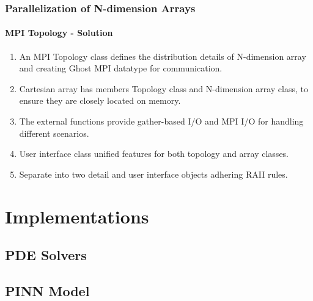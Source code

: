 \begin{frame}
  \frametitle{Parallelization of N-dimension Arrays}
  \framesubtitle{MPI Topology - Solution}
  \begin{enumerate}
    \item An MPI Topology class defines the distribution details of N-dimension array and creating Ghost MPI datatype 
    for communication.
    \item Cartesian array has members Topology class and N-dimension array class, to ensure they are closely located on memory.
    \item The external functions provide gather-based I/O and MPI I/O for handling different scenarios.
    \item User interface class unified features for both topology and array classes.
    \item Separate into two detail and user interface objects adhering RAII rules.
  \end{enumerate}
\end{frame}



\section{Implementations}
\subsection{PDE Solvers}
\begin{frame}
  \frametitle{}

  

\end{frame}



\subsection{PINN Model}
\begin{frame}
  \frametitle{}

  

\end{frame}
